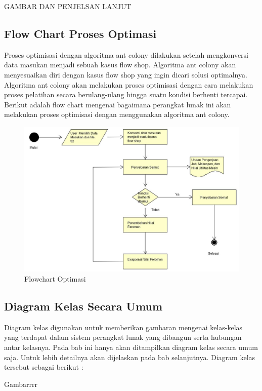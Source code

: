 	GAMBAR DAN PENJELSAN LANJUT
	
	\subsection{Flow Chart Proses Optimasi}
	
	Proses optimisasi dengan algoritma ant colony dilakukan setelah mengkonversi data masukan menjadi
	sebuah kasus flow shop. Algoritma ant colony akan menyesuaikan diri dengan kasus flow shop yang ingin 
	dicari solusi optimalnya. Algoritma ant colony akan melakukan proses optimisasi dengan cara melakukan 
	proses pelatihan secara berulang-ulang hingga suatu kondisi berhenti tercapai. Berikut adalah flow chart 
	mengenai bagaimana perangkat lunak ini akan melakukan proses optimisasi dengan menggunakan algoritma ant colony.
	\begin{figure}[H]
		\centering
		\includegraphics[scale=0.40]{Flowchart}
		\caption[Flowchart]{Flowchart Optimasi}
		\label{fig:flowchartoptimasi}
	\end{figure}
	
	
	\subsection{Diagram Kelas Secara Umum}
	
	Diagram kelas digunakan untuk memberikan gambaran mengenai kelas-kelas yang terdapat dalam
	sistem perangkat lunak yang dibangun serta hubungan antar kelasnya. Pada bab ini hanya akan ditampilkan
	diagram kelas secara umum saja. Untuk lebih detailnya akan dijelaskan pada bab selanjutnya. Diagram kelas
	tersebut sebagai berikut : 
	
	Gambarrrr
	
